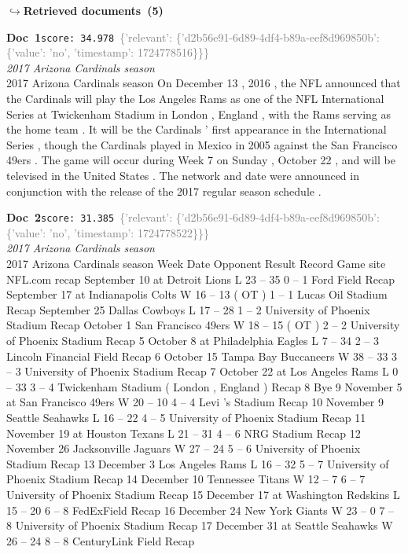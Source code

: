 \documentclass[a4paper,11pt]{article}
\begin{document}
\noindent\hfill{\footnotesize\textcolor{doccolor}{\textbf{$\hookrightarrow$\enspace Retrieved documents~(5)}}}
\begin{docenv}
{\footnotesize\textcolor{doccolor}{\textbf{Doc~1}}}\hfill{\tiny\texttt{score:~34.978}}\ {\tiny\textcolor{gray}{\{'relevant': \{'d2b56e91-6d89-4df4-b89a-eef8d969850b': \{'value': 'no', 'timestamp': 1724778516\}\}\}}}\\[3pt]
{\small\textit{2017 Arizona Cardinals season}}\\[2pt]
\vspace{2pt}
{\footnotesize 2017 Arizona Cardinals season
On December 13 , 2016 , the NFL announced that the Cardinals will play the Los Angeles Rams as one of the NFL International Series at Twickenham Stadium in London , England , with the Rams serving as the home team . It will be the Cardinals ' first appearance in the International Series , though the Cardinals played in Mexico in 2005 against the San Francisco 49ers . The game will occur during Week 7 on Sunday , October 22 , and will be televised in the United States . The network and date were announced in conjunction with the release of the 2017 regular season schedule .}
\end{docenv}
\begin{docenv}
{\footnotesize\textcolor{doccolor}{\textbf{Doc~2}}}\hfill{\tiny\texttt{score:~31.385}}\ {\tiny\textcolor{gray}{\{'relevant': \{'d2b56e91-6d89-4df4-b89a-eef8d969850b': \{'value': 'no', 'timestamp': 1724778522\}\}\}}}\\[3pt]
{\small\textit{2017 Arizona Cardinals season}}\\[2pt]
\vspace{2pt}
{\footnotesize 2017 Arizona Cardinals season
Week Date Opponent Result Record Game site NFL.com recap September 10 at Detroit Lions L 23 -- 35 0 -- 1 Ford Field Recap September 17 at Indianapolis Colts W 16 -- 13 ( OT ) 1 -- 1 Lucas Oil Stadium Recap September 25 Dallas Cowboys L 17 -- 28 1 -- 2 University of Phoenix Stadium Recap October 1 San Francisco 49ers W 18 -- 15 ( OT ) 2 -- 2 University of Phoenix Stadium Recap 5 October 8 at Philadelphia Eagles L 7 -- 34 2 -- 3 Lincoln Financial Field Recap 6 October 15 Tampa Bay Buccaneers W 38 -- 33 3 -- 3 University of Phoenix Stadium Recap 7 October 22 at Los Angeles Rams L 0 -- 33 3 -- 4 Twickenham Stadium ( London , England ) Recap 8 Bye 9 November 5 at San Francisco 49ers W 20 -- 10 4 -- 4 Levi 's Stadium Recap 10 November 9 Seattle Seahawks L 16 -- 22 4 -- 5 University of Phoenix Stadium Recap 11 November 19 at Houston Texans L 21 -- 31 4 -- 6 NRG Stadium Recap 12 November 26 Jacksonville Jaguars W 27 -- 24 5 -- 6 University of Phoenix Stadium Recap 13 December 3 Los Angeles Rams L 16 -- 32 5 -- 7 University of Phoenix Stadium Recap 14 December 10 Tennessee Titans W 12 -- 7 6 -- 7 University of Phoenix Stadium Recap 15 December 17 at Washington Redskins L 15 -- 20 6 -- 8 FedExField Recap 16 December 24 New York Giants W 23 -- 0 7 -- 8 University of Phoenix Stadium Recap 17 December 31 at Seattle Seahawks W 26 -- 24 8 -- 8 CenturyLink Field Recap}
\end{docenv}
\end{document}
